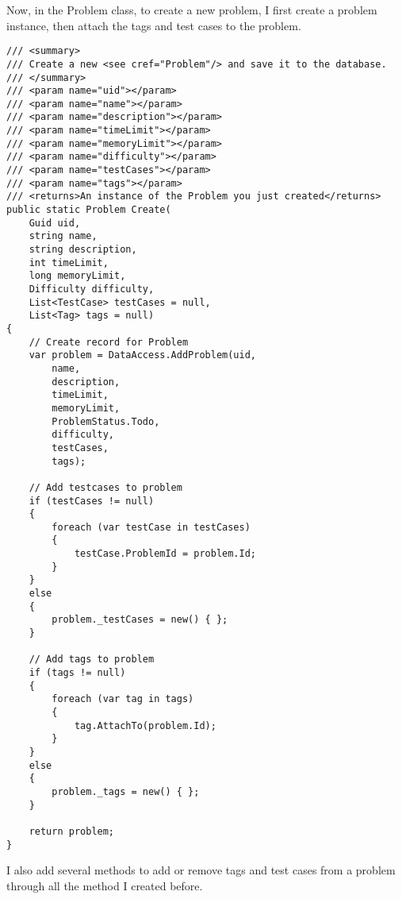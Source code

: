 \documentclass[report.tex]{subfiles}
\begin{document}
Now, in the Problem class, to create a new problem, I first create a problem instance, then attach the tags and test cases to the problem.

\begin{verbatim}
/// <summary>
/// Create a new <see cref="Problem"/> and save it to the database.
/// </summary>
/// <param name="uid"></param>
/// <param name="name"></param>
/// <param name="description"></param>
/// <param name="timeLimit"></param>
/// <param name="memoryLimit"></param>
/// <param name="difficulty"></param>
/// <param name="testCases"></param>
/// <param name="tags"></param>
/// <returns>An instance of the Problem you just created</returns>
public static Problem Create(
    Guid uid,
    string name,
    string description,
    int timeLimit,
    long memoryLimit,
    Difficulty difficulty,
    List<TestCase> testCases = null,
    List<Tag> tags = null)
{
    // Create record for Problem
    var problem = DataAccess.AddProblem(uid,
        name,
        description,
        timeLimit,
        memoryLimit,
        ProblemStatus.Todo,
        difficulty,
        testCases,
        tags);

    // Add testcases to problem
    if (testCases != null)
    {
        foreach (var testCase in testCases)
        {
            testCase.ProblemId = problem.Id;
        }
    }
    else
    {
        problem._testCases = new() { };
    }

    // Add tags to problem
    if (tags != null)
    {
        foreach (var tag in tags)
        {
            tag.AttachTo(problem.Id);
        }
    }
    else
    {
        problem._tags = new() { };
    }

    return problem;
}
\end{verbatim}

I also add several methods to add or remove tags and test cases from a problem through all the method I created before.
\end{document}
